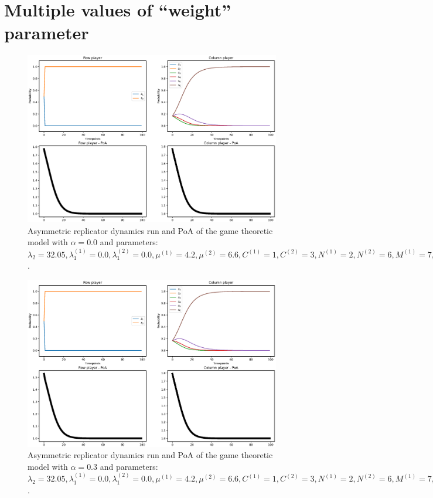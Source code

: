 \section{Multiple values of ``weight'' parameter}


\begin{figure}[H]
    \includegraphics[width=\textwidth, trim = 0 60 0 60, clip]{chapters/00_appendix/02_more_game_results/Bin/poa_ard_alpha_0.eps}
    \caption{Asymmetric replicator dynamics run and PoA of the game theoretic
    model with \(\alpha = 0.0\) and parameters: \(\lambda_2 = 32.05,
    \lambda_1^{(1)} = 0.0, \lambda_1^{(2)} = 0.0, \mu^{(1)} = 4.2,
    \mu^{(2)} = 6.6, C^{(1)} = 1, C^{(2)} = 3, N^{(1)} = 2, N^{(2)} = 6,
    M^{(1)} = 7, M^{(2)} = 4, t = 2.0\).}
    \label{fig:poa_ard_alpha_0}
\end{figure}



\begin{figure}[H]
    \includegraphics[width=\textwidth, trim = 0 60 0 60, clip]{chapters/00_appendix/02_more_game_results/Bin/poa_ard_alpha_03.eps}
    \caption{Asymmetric replicator dynamics run and PoA of the game theoretic
    model with \(\alpha = 0.3\) and parameters: \(\lambda_2 = 32.05,
    \lambda_1^{(1)} = 0.0, \lambda_1^{(2)} = 0.0, \mu^{(1)} = 4.2,
    \mu^{(2)} = 6.6, C^{(1)} = 1, C^{(2)} = 3, N^{(1)} = 2, N^{(2)} = 6,
    M^{(1)} = 7, M^{(2)} = 4, t = 2.0\).}
    \label{fig:poa_ard_alpha_03}
\end{figure}




